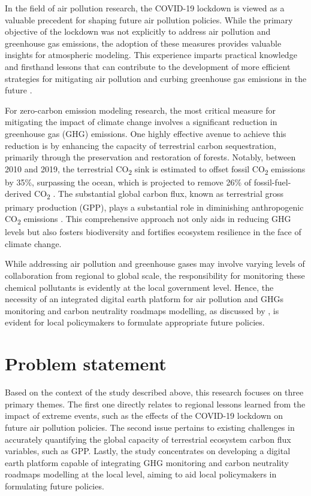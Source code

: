 In the field of air pollution research, the COVID-19 lockdown is viewed as a valuable precedent for shaping future air pollution policies. While the primary objective of the lockdown was not explicitly to address air pollution and greenhouse gas emissions, the adoption of these measures provides valuable insights for atmospheric modeling. This experience imparts practical knowledge and firsthand lessons that can contribute to the development of more efficient strategies for mitigating air pollution and curbing greenhouse gas emissions in the future \citep{grange2021covid}. \par

For zero-carbon emission modeling research, the most critical measure for mitigating the impact of climate change involves a significant reduction in greenhouse gas (GHG) emissions. One highly effective avenue to achieve this reduction is by enhancing the capacity of terrestrial carbon sequestration, primarily through the preservation and restoration of forests. Notably, between 2010 and 2019, the terrestrial CO\textsubscript{2} sink is estimated to offset fossil CO\textsubscript{2} emissions by 35\%, surpassing the ocean, which is projected to remove 26\% of fossil-fuel-derived CO\textsubscript{2} \citep{friedlingstein2020global, wang2022disentangling}. The substantial global carbon flux, known as terrestrial gross primary production (GPP), plays a substantial role in diminishing anthropogenic CO\textsubscript{2} emissions \citep{beer2010terrestrial}. This comprehensive approach not only aids in reducing GHG levels but also fosters biodiversity and fortifies ecosystem resilience in the face of climate change. \par

While addressing air pollution and greenhouse gases may involve varying levels of collaboration from regional to global scale, the responsibility for monitoring these chemical pollutants is evidently at the local government level. Hence, the necessity of an integrated digital earth platform for air pollution and GHGs monitoring and carbon neutrality roadmaps modelling, as discussed by \citep{fukui2021digital}, is evident for local policymakers to formulate appropriate future policies. \par

\section{Problem statement}
Based on the context of the study described above, this research focuses on three primary themes. The first one directly relates to regional lessons learned from the impact of extreme events, such as the effects of the COVID-19 lockdown on future air pollution policies. The second issue pertains to existing challenges in accurately quantifying the global capacity of terrestrial ecosystem carbon flux variables, such as GPP. Lastly, the study concentrates on developing a digital earth platform capable of integrating GHG monitoring and carbon neutrality roadmaps modelling at the local level, aiming to aid local policymakers in formulating future policies. \par

